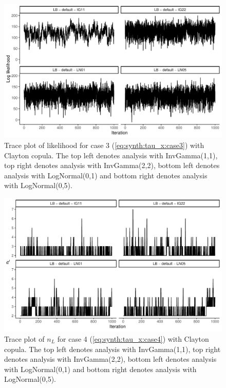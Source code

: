\documentclass{amsart}
\begin{document}
\begin{figure}
	\centering
	\includegraphics[width = 0.75\linewidth]{trace_case3_clayton_like.pdf}
	\caption{Trace plot of likelihood for case 3 (\cref{eq:synth:tau_x:case3}) with Clayton copula. The top left denotes analysis with InvGamma(1,1), top right denotes analysis with InvGamma(2,2), bottom left denotes analysis with LogNormal(0,1) and bottom right denotes analysis with LogNormal(0,5).}
	\label{fig:case3:clayton:like}
\end{figure}

\begin{figure}
	\centering
	\includegraphics[width = 0.75\linewidth]{trace_case4_clayton_nterm.pdf}
	\caption{Trace plot of $n_L$ for case 4 (\cref{eq:synth:tau_x:case4}) with Clayton copula. The top left denotes analysis with InvGamma(1,1), top right denotes analysis with InvGamma(2,2), bottom left denotes analysis with LogNormal(0,1) and bottom right denotes analysis with LogNormal(0,5).}
	\label{fig:case4:clayton:nterm}
\end{figure}
\end{document}
